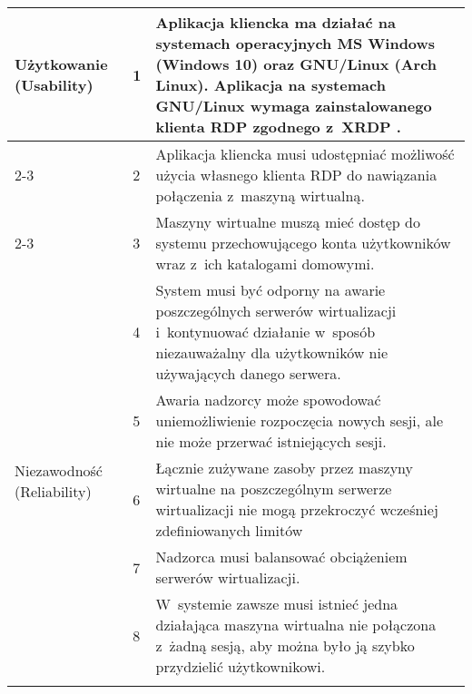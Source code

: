 \documentclass[../wstep.tex]{subfiles}
\begin{document}
\begin{longtable}{|p{}|p{}|p{}|}
    \multirow[t]{11}{=}{Użytkowanie (Usability)}    & 1            & Aplikacja kliencka ma działać na systemach operacyjnych MS Windows (Windows 10) oraz GNU/Linux (Arch Linux). Aplikacja na systemach GNU/Linux wymaga zainstalowanego klienta RDP zgodnego z~XRDP \parencite{xrdp-clients}. \\ \cline{2-3}
                                                    & 2            & Aplikacja kliencka musi udostępniać możliwość użycia własnego klienta RDP do nawiązania połączenia z~maszyną wirtualną.                                                                                                     \\ \cline{2-3}
                                                    & 3            & Maszyny wirtualne muszą mieć dostęp do systemu przechowującego konta użytkowników wraz z~ich katalogami domowymi.                                                                                                           \\ \hline
    \multirow[t]{7}{=}{Niezawodność (Reliability)}  & 4            & System musi być odporny na awarie poszczególnych serwerów wirtualizacji i~kontynuować działanie w~sposób niezauważalny dla użytkowników nie używających danego serwera.                                                    \\ \cline{2-3}
                                                    & 5            & Awaria nadzorcy może spowodować uniemożliwienie rozpoczęcia nowych sesji, ale nie może przerwać istniejących sesji.                                                                                                         \\ \hline
    \multirow[t]{11}{=}{Wydajność (Performance)}    & 6            & Łącznie zużywane zasoby przez maszyny wirtualne na poszczególnym serwerze wirtualizacji nie mogą przekroczyć wcześniej zdefiniowanych limitów                                                                              \\ \cline{2-3}
                                                    & 7            & Nadzorca musi balansować obciążeniem serwerów wirtualizacji.                                                                                                                                                                 \\ \cline{2-3}
                                                    & 8            & W~systemie zawsze musi istnieć jedna działająca maszyna wirtualna nie połączona z~żadną sesją, aby można było ją szybko przydzielić użytkownikowi.                                                                         \\ \cline{2-3}

\end{longtable}
\end{document}
